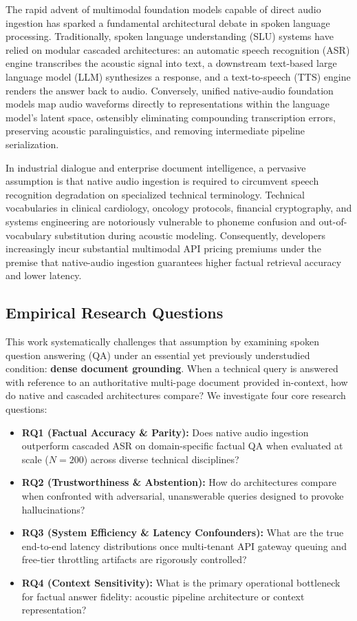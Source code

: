 \documentclass[10pt,a4paper,twocolumn]{article}
\begin{document}
The rapid advent of multimodal foundation models capable of direct audio ingestion has sparked a fundamental architectural debate in spoken language processing. Traditionally, spoken language understanding (SLU) systems have relied on modular cascaded architectures: an automatic speech recognition (ASR) engine transcribes the acoustic signal into text, a downstream text-based large language model (LLM) synthesizes a response, and a text-to-speech (TTS) engine renders the answer back to audio. Conversely, unified native-audio foundation models map audio waveforms directly to representations within the language model's latent space, ostensibly eliminating compounding transcription errors, preserving acoustic paralinguistics, and removing intermediate pipeline serialization.

In industrial dialogue and enterprise document intelligence, a pervasive assumption is that native audio ingestion is required to circumvent speech recognition degradation on specialized technical terminology. Technical vocabularies in clinical cardiology, oncology protocols, financial cryptography, and systems engineering are notoriously vulnerable to phoneme confusion and out-of-vocabulary substitution during acoustic modeling. Consequently, developers increasingly incur substantial multimodal API pricing premiums under the premise that native-audio ingestion guarantees higher factual retrieval accuracy and lower latency.

\subsection{Empirical Research Questions}
This work systematically challenges that assumption by examining spoken question answering (QA) under an essential yet previously understudied condition: \textbf{dense document grounding}. When a technical query is answered with reference to an authoritative multi-page document provided in-context, how do native and cascaded architectures compare? We investigate four core research questions:
\begin{itemize}
    \item \textbf{RQ1 (Factual Accuracy \& Parity):} Does native audio ingestion outperform cascaded ASR on domain-specific factual QA when evaluated at scale ($N = 200$) across diverse technical disciplines?
    \item \textbf{RQ2 (Trustworthiness \& Abstention):} How do architectures compare when confronted with adversarial, unanswerable queries designed to provoke hallucinations?
    \item \textbf{RQ3 (System Efficiency \& Latency Confounders):} What are the true end-to-end latency distributions once multi-tenant API gateway queuing and free-tier throttling artifacts are rigorously controlled?
    \item \textbf{RQ4 (Context Sensitivity):} What is the primary operational bottleneck for factual answer fidelity: acoustic pipeline architecture or context representation?
\end{itemize}
\end{document}
